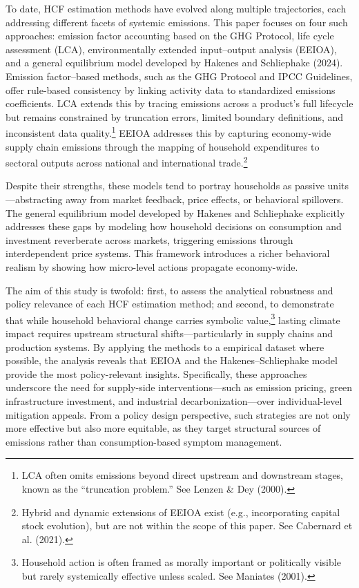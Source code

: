 \documentclass[12pt,a4paper]{article}%
\begin{document}
To date, HCF estimation methods have evolved along multiple trajectories, each addressing different facets of systemic emissions. This paper focuses on four such approaches: emission factor accounting based on the GHG Protocol, life cycle assessment (LCA), environmentally extended input--output analysis (EEIOA), and a general equilibrium model developed by Hakenes and Schliephake (2024). Emission factor--based methods, such as the GHG Protocol and IPCC Guidelines, offer rule-based consistency by linking activity data to standardized emissions coefficients. LCA extends this by tracing emissions across a product’s full lifecycle but remains constrained by truncation errors, limited boundary definitions, and inconsistent data quality.\footnote{LCA often omits emissions beyond direct upstream and downstream stages, known as the ``truncation problem.'' See Lenzen \& Dey (2000).} EEIOA addresses this by capturing economy-wide supply chain emissions through the mapping of household expenditures to sectoral outputs across national and international trade.\footnote{Hybrid and dynamic extensions of EEIOA exist (e.g., incorporating capital stock evolution), but are not within the scope of this paper. See Cabernard et al. (2021).}

Despite their strengths, these models tend to portray households as passive units—abstracting away from market feedback, price effects, or behavioral spillovers. The general equilibrium model developed by Hakenes and Schliephake explicitly addresses these gaps by modeling how household decisions on consumption and investment reverberate across markets, triggering emissions through interdependent price systems. This framework introduces a richer behavioral realism by showing how micro-level actions propagate economy-wide.

The aim of this study is twofold: first, to assess the analytical robustness and policy relevance of each HCF estimation method; and second, to demonstrate that while household behavioral change carries symbolic value,\footnote{Household action is often framed as morally important or politically visible but rarely systemically effective unless scaled. See Maniates (2001).} lasting climate impact requires upstream structural shifts—particularly in supply chains and production systems. By applying the methods to a empirical dataset where possible, the analysis reveals that EEIOA and the Hakenes--Schliephake model provide the most policy-relevant insights. Specifically, these approaches underscore the need for supply-side interventions—such as emission pricing, green infrastructure investment, and industrial decarbonization—over individual-level mitigation appeals. From a policy design perspective, such strategies are not only more effective but also more equitable, as they target structural sources of emissions rather than consumption-based symptom management.
\end{document}
